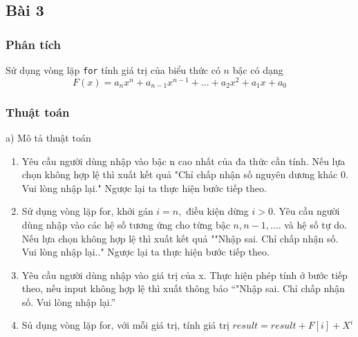 \documentclass[a4paper]{article}
\begin{document}
\subsection{Bài 3}
\subsubsection{Phân tích}
Sử dụng vòng lặp \texttt{for} tính giá trị của biểu thức có $n$ bậc có dạng
$$
F(x) = a_{n}x^{n} + a_{n-1}x^{n-1} + ... + a_{2}x^{2} + a_{1}x + a_{0}
$$
\subsubsection{Thuật toán}
a) Mô tả thuật toán
\vspace{-10pt}
\begin{enumerate}
    \item Yêu cầu người dùng nhập vào bậc n cao nhất của đa thức cần tính. Nếu lựa chọn không hợp lệ thì xuất kết quả "Chỉ chấp nhận số nguyên dương khác 0. Vui lòng nhập lại." Ngược lại ta thực hiện bước tiếp theo.
    \item Sử dụng vòng lặp for, khởi gán $i = n,$ điều kiện dừng $i > 0$. Yêu cầu người dùng nhập vào các hệ số tương ứng cho từng bậc $n, n-1, …$. và hệ số tự do. Nếu lựa chọn không hợp lệ thì xuất kết quả ""Nhập sai. Chỉ chấp nhận số. Vui lòng nhập lại.." Ngược lại ta thực hiện bước tiếp theo.
    \item Yêu cầu người dùng nhập vào giá trị của x. Thực hiện phép tính ở bước tiếp theo, nếu input không hợp lệ thì xuất thông báo “"Nhập sai. Chỉ chấp nhận số. Vui lòng nhập lại.”
    \item Sủ dụng vòng lặp for, với mỗi giá trị, tính giá trị $result = result + F[i] + X^{i}$
\end{enumerate}
\end{document}

